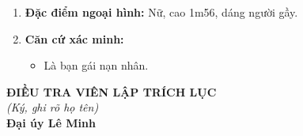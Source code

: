 \documentclass[12pt,a4paper]{article}
\begin{document}
\begin{enumerate}[label=\arabic*., leftmargin=*, itemsep=2pt, topsep=2pt, parsep=0pt]
  \item \textbf{Đặc điểm ngoại hình:} Nữ, cao 1m56, dáng người gầy.
  \item \textbf{Căn cứ xác minh:}
\begin{itemize}[leftmargin=*, itemsep=2pt, topsep=2pt, parsep=0pt]
  \item Là bạn gái nạn nhân.
\end{itemize}
\end{enumerate}
\vspace{0.8cm}
\noindent
\hfill
\begin{minipage}[t]{0.50\textwidth}
    \begin{center}
        \textbf{ĐIỀU TRA VIÊN LẬP TRÍCH LỤC}\\[0.1cm]
        \textit{(Ký, ghi rõ họ tên)}\\[1.6cm]
        \textbf{Đại úy Lê Minh}
    \end{center}
\end{minipage}
\end{document}
